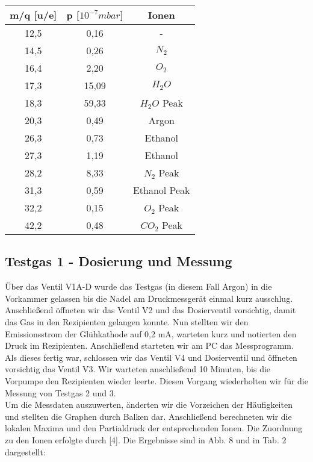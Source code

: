 \begin{center}
\begin{tabular}{c|c|c}
m/q [u/e] & p [$10^{-7} mbar$] & Ionen\\	
\hline	
12,5 &	0,16 & - \\
14,5 &	0,26 & $N_2$\\
16,4 &	2,20 & $O_2$\\
17,3 &	15,09 & $H_2O$\\
18,3 &	59,33 & $H_2O$ Peak\\
20,3 &	0,49 & Argon\\
26,3 &	0,73 & Ethanol\\
27,3 &	1,19 & Ethanol\\
28,2 &	8,33 & $N_2$ Peak\\
31,3 &	0,59 & Ethanol Peak\\
32,2 &	0,15 & $O_2$ Peak\\
42,2 &	0,48 & $CO_2$ Peak\\
\end{tabular}
\end{center}

\subsection{Testgas 1 - Dosierung und Messung}
Über das Ventil V1A-D wurde das Testgas (in diesem Fall Argon) in die Vorkammer gelassen bis die Nadel am Druckmessgerät einmal kurz ausschlug. Anschließend öffneten wir das Ventil V2 und das Dosierventil vorsichtig, damit das Gas in den Rezipienten gelangen konnte. Nun stellten wir den Emissionsstrom der Glühkathode auf 0,2 mA, warteten kurz und notierten den Druck im Rezipienten. Anschließend starteten wir am PC das Messprogramm. Als dieses fertig war, schlossen wir das Ventil V4 und Dosierventil und öffneten vorsichtig das Ventil V3. Wir warteten anschließend 10 Minuten, bis die Vorpumpe den Rezipienten wieder leerte. Diesen Vorgang wiederholten wir für die Messung von Testgas 2 und 3.\\
Um die Messdaten auszuwerten, änderten wir die Vorzeichen der Häufigkeiten und stellten die Graphen durch Balken dar. Anschließend berechneten wir die lokalen Maxima und den Partialdruck der entsprechenden Ionen. Die Zuordnung zu den Ionen erfolgte durch [4]. Die Ergebnisse sind in Abb. 8 und in Tab. 2 dargestellt:\\

